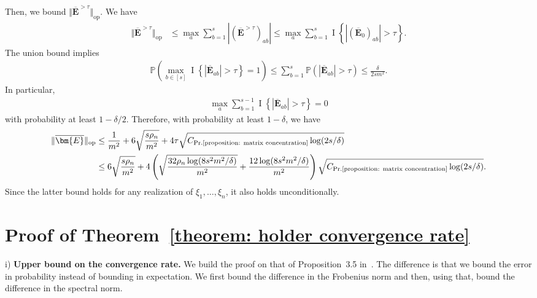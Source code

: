 \documentclass[11pt]{article}
\newcommand{\op}{\mathrm{op}}
\newcommand{\bE}{\bm{E}}
\newcommand{\bbP}{\mathbb{P}}
\newcommand{\indicator}[1]{{\operatorname{I} \left \{ #1\right \}}}
\newcommand{\constantBandeira}{C_{\text{Pr.\ref{proposition: matrix concentration}}}}
\newcommand{\<}{\langle}
\renewcommand{\>}{\rangle}
\newcommand{\avgMatrix}{\overline{\bm{E}}}
\newcommand{\avgLarge}{\overline{\bm{E}}^{> \tau}}
\theoremstyle{plain}
\theoremstyle{definition}
\theoremstyle{remark}
\begin{document}
{Then, we bound $\Vert \avgLarge \Vert_{\op}$. We have
\begin{align*}
    \Vert \avgLarge \Vert_{\op} & \le \max_a \sum_{b = 1}^s |(\avgLarge)_{ab}| \le \max_{a} \sum_{b = 1}^s \indicator{|(\overline{\bE}_0)_{ab}| > \tau}.
\end{align*}
The union bound implies
\begin{align*}
    \bbP \left (\max_{b \in [s]} \indicator{|\avgMatrix_{ab}| > \tau} = 1 \right ) \le \sum_{b = 1}^s \bbP \left ( |\avgMatrix_{ab}| > \tau \right ) \le \frac{\delta}{2s m^2}.
\end{align*}
In particular, 
\begin{align*}
    \max_{a} \sum_{b = 1}^{s - 1} \indicator{|\avgMatrix_{ab}| > \tau} = 0
\end{align*}
with probability at least $1 - \delta/2$. Therefore, with probability at least $1 - \delta$, we have
\begin{align*}
    \Vert \avgMatrix\Vert_{\op} & \le \frac{1}{m^2} + 6 \sqrt{\frac{s \rho_n}{m^2}} + 4 \tau \sqrt{\constantBandeira \log(2s/\delta)} \\
    & \le  6 \sqrt{\frac{s \rho_n}{m^2}} + 4 \left ( \sqrt{\frac{32 \rho_n \log(8 s^2 m^2/\delta)}{m^2}} + \frac{12 \log(8 s^2 m^2/\delta)}{m^2}\right ) \sqrt{\constantBandeira \log(2s/\delta)}.
\end{align*}
Since the latter bound holds for any realization of $\xi_1, \ldots, \xi_n$, it also holds unconditionally.



\section{Proof of Theorem~\ref{theorem: holder convergence rate}}
\label{appendix: proof of Holder convergence rate}



i) \textbf{Upper bound on the convergence rate.} We build the proof on that of Proposition~3.5 in~\citep{klopp2017}. The difference is that we bound the error in probability instead of bounding in expectation. We first bound the difference in the Frobenius norm and then, using that, bound the difference in the spectral norm. 


}
\end{document}
